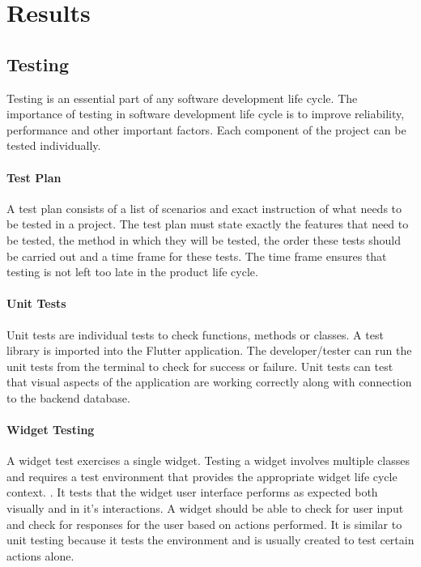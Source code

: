 \chapter{Results}

\section{Testing}
Testing is an essential part of any software development life cycle. The importance of testing in software development life cycle is to improve reliability, performance and other important factors.\cite{TestingLifeCycle} Each component of the project can be tested individually.

\subsubsection{Test Plan}
A test plan consists of a list of scenarios and exact instruction of what needs to be tested in a project. The test plan must state exactly the features that need to be tested, the method in which they will be tested, the order these tests should be carried out and a time frame for these tests. The time frame ensures that testing is not left too late in the product life cycle.\cite{testPlan}
 
\subsubsection{Unit Tests}

Unit tests are individual tests to check functions, methods or classes. A test library is imported into the Flutter application. The developer/tester can run the unit tests from the terminal to check for success or failure. Unit tests can test that visual aspects of the application are working correctly along with connection to the backend database.

\subsubsection{Widget Testing}

A widget test exercises a single widget. Testing a widget involves multiple classes and requires a test environment that provides the appropriate widget life cycle context. \cite{testing}. It tests that the widget user interface performs as expected both visually and in it’s interactions. A widget should be able to check for user input and check for responses for the user based on actions performed. It is similar to unit testing because it tests the environment and is usually created to test certain actions alone.

